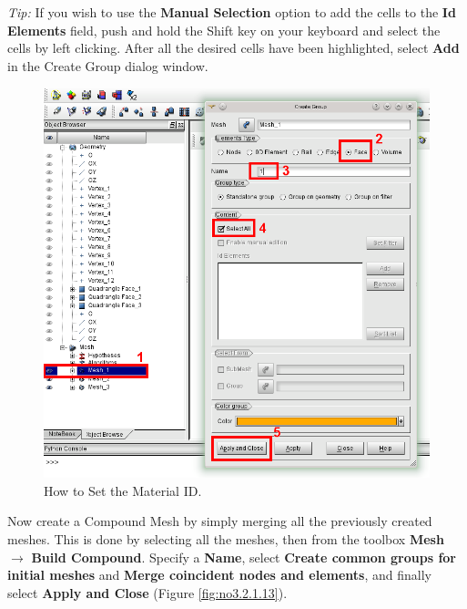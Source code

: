\textit{Tip:} If you wish to use the \textbf{Manual Selection} option to add the cells to the \textbf{Id Elements} field, push and hold the Shift key on your keyboard and select the cells by left clicking. After all the desired cells have been highlighted, select \textbf{Add} in the Create Group dialog window.

\begin{figure}[tbp]
\begin{center}
\includegraphics[scale=0.50]{figures/SalomeStep4.png}
\caption{How to Set the Material ID.}
\label{fig:no3.2.1.12}
\end{center}
\end{figure}

Now create a Compound Mesh by simply merging all the previously created meshes. This is done by selecting all the meshes, then from the toolbox \textbf{Mesh} $\rightarrow$ \textbf{Build Compound}. Specify a \textbf{Name}, select \textbf{Create common groups for initial meshes} and \textbf{Merge coincident nodes and elements}, and finally select \textbf{Apply and Close} (Figure \ref{fig:no3.2.1.13}).
        
